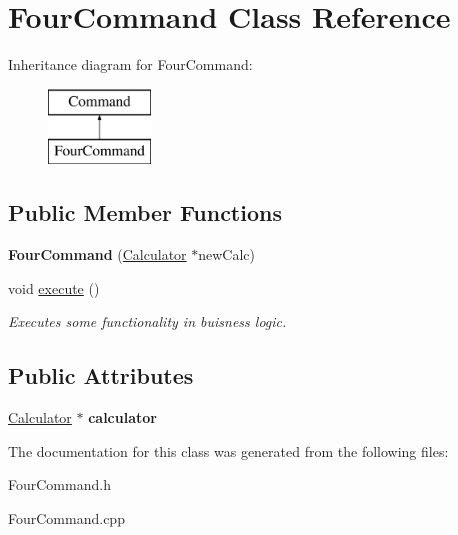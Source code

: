 \hypertarget{class_four_command}{}\section{Four\+Command Class Reference}
\label{class_four_command}
Inheritance diagram for Four\+Command\+:\begin{figure}[H]
\begin{center}
\leavevmode
\includegraphics[height=2.000000cm]{class_four_command}
\end{center}
\end{figure}
\subsection*{Public Member Functions}
\begin{DoxyCompactItemize}
\item 
\hypertarget{class_four_command_acba8d0c8c5e4951816c271015f22095e}{}{\bfseries Four\+Command} (\hyperlink{class_calculator}{Calculator} $\ast$new\+Calc)\label{class_four_command_acba8d0c8c5e4951816c271015f22095e}

\item 
\hypertarget{class_four_command_abc26a6d79d1897ab73b963f7737315ef}{}void \hyperlink{class_four_command_abc26a6d79d1897ab73b963f7737315ef}{execute} ()\label{class_four_command_abc26a6d79d1897ab73b963f7737315ef}

\begin{DoxyCompactList}\small\item\em Executes some functionality in buisness logic. \end{DoxyCompactList}\end{DoxyCompactItemize}
\subsection*{Public Attributes}
\begin{DoxyCompactItemize}
\item 
\hypertarget{class_four_command_a3a411398976791c35d4a3c131f592116}{}\hyperlink{class_calculator}{Calculator} $\ast$ {\bfseries calculator}\label{class_four_command_a3a411398976791c35d4a3c131f592116}

\end{DoxyCompactItemize}


The documentation for this class was generated from the following files\+:\begin{DoxyCompactItemize}
\item 
Four\+Command.\+h\item 
Four\+Command.\+cpp\end{DoxyCompactItemize}
